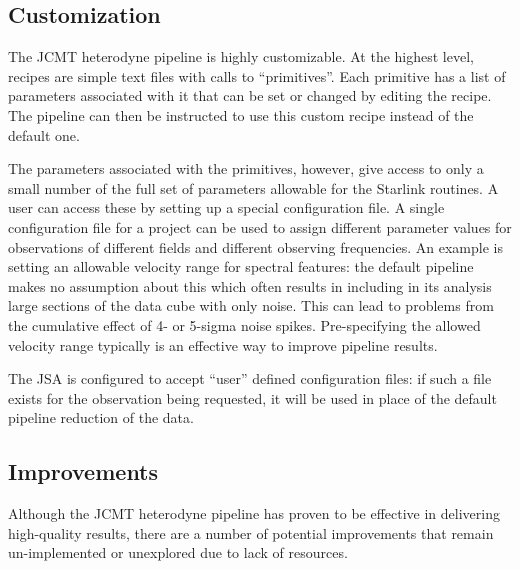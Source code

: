 \documentclass[final,authoryear,5p,times,twocolumn]{elsarticle}
\begin{document}
\subsection{Customization}

The JCMT heterodyne pipeline is highly customizable. At the highest level, recipes
are simple text files with calls to ``primitives''. Each primitive has a list of
parameters associated with it that can be set or changed by editing the recipe.
The pipeline can then be instructed to use this custom recipe instead of the default one.

The parameters associated with the primitives, however, give access to only a small
number of the full set of parameters allowable for the Starlink routines. A user can access
these by setting up a special configuration file. A single configuration file for a project can
be used to assign different parameter values for observations of different fields and
different observing frequencies. An example is setting an allowable velocity range for
spectral features: the default pipeline makes no assumption about this which often results
in including in its analysis large sections of the data cube with only noise. This can lead
to problems from the cumulative effect of 4- or 5-sigma noise spikes. Pre-specifying the
allowed velocity range typically is an effective way to improve pipeline results.

The JSA is configured to accept ``user'' defined configuration files: if such
a file exists for the observation being requested, it will be used in place of the default
pipeline reduction of the data.

\subsection{Improvements}

Although the JCMT heterodyne pipeline has proven to be effective in delivering
high-quality results, there are a number of potential improvements that remain
un-implemented or unexplored due to lack of resources.
\end{document}
